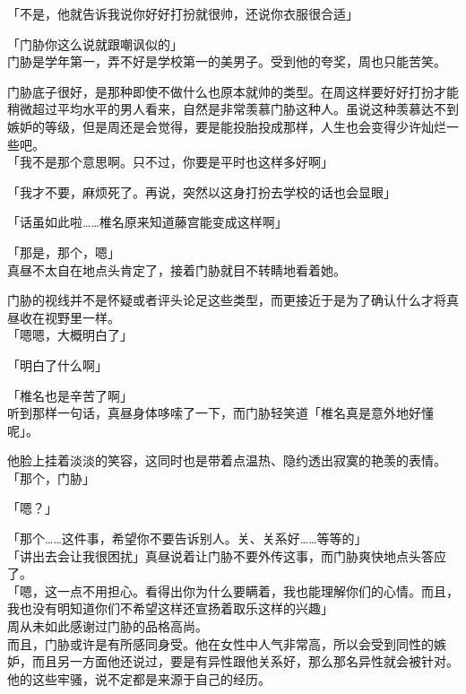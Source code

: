 「不是，他就告诉我说你好好打扮就很帅，还说你衣服很合适」

「门胁你这么说就跟嘲讽似的」\\

门胁是学年第一，弄不好是学校第一的美男子。受到他的夸奖，周也只能苦笑。

门胁底子很好，是那种即使不做什么也原本就帅的类型。在周这样要好好打扮才能稍微超过平均水平的男人看来，自然是非常羡慕门胁这种人。虽说这种羡慕达不到嫉妒的等级，但是周还是会觉得，要是能投胎投成那样，人生也会变得少许灿烂一些吧。\\

「我不是那个意思啊。只不过，你要是平时也这样多好啊」

「我才不要，麻烦死了。再说，突然以这身打扮去学校的话也会显眼」

「话虽如此啦……椎名原来知道藤宫能变成这样啊」

「那是，那个，嗯」\\

真昼不太自在地点头肯定了，接着门胁就目不转睛地看着她。

门胁的视线并不是怀疑或者评头论足这些类型，而更接近于是为了确认什么才将真昼收在视野里一样。\\

「嗯嗯，大概明白了」

「明白了什么啊」

「椎名也是辛苦了啊」\\

听到那样一句话，真昼身体哆嗦了一下，而门胁轻笑道「椎名真是意外地好懂呢」。

他脸上挂着淡淡的笑容，这同时也是带着点温热、隐约透出寂寞的艳羡的表情。\\

「那个，门胁」

「嗯？」

「那个……这件事，希望你不要告诉别人。关、关系好……等等的」\\

「讲出去会让我很困扰」真昼说着让门胁不要外传这事，而门胁爽快地点头答应了。\\

「嗯，这一点不用担心。看得出你为什么要瞒着，我也能理解你们的心情。而且，我也没有明知道你们不希望这样还宣扬着取乐这样的兴趣」\\

周从未如此感谢过门胁的品格高尚。\\

而且，门胁或许是有所感同身受。他在女性中人气非常高，所以会受到同性的嫉妒，而且另一方面他还说过，要是有异性跟他关系好，那么那名异性就会被针对。他的这些牢骚，说不定都是来源于自己的经历。\\

